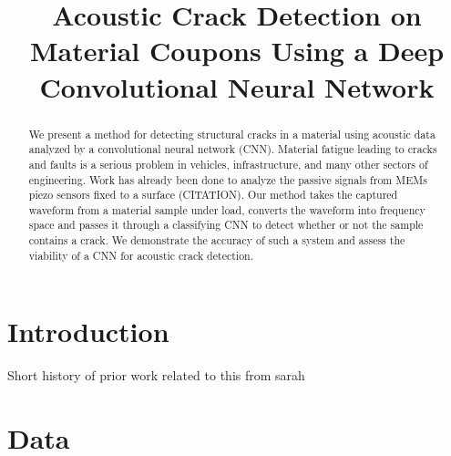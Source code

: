 \documentclass[conference]{IEEEtran}
\begin{document}
\title{Acoustic Crack Detection on Material Coupons Using a Deep Convolutional Neural Network
}

\author{
\and
{}
\and
{}
\and
}

\maketitle

\begin{abstract}
We present a method for detecting structural cracks in a material using acoustic
data analyzed by a convolutional neural network (CNN). Material fatigue leading
to cracks and faults is a serious problem in vehicles, infrastructure, and many
other sectors of engineering. Work has already been done to analyze the passive
signals from MEMs piezo sensors fixed to a surface (CITATION). Our method takes
the captured waveform from a material sample under load, converts the waveform
into frequency space and passes it through a classifying CNN to detect
whether or not the sample contains a crack. We demonstrate the accuracy of such
a system and assess the viability of a CNN for acoustic crack detection.
\end{abstract}

\section{Introduction}

Short history of prior work related to this from sarah

\section{Data}
\end{document}
